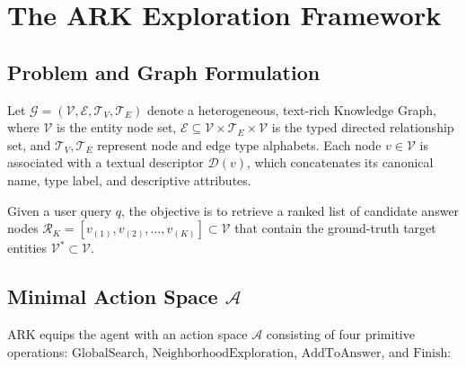 \documentclass[11pt]{article}
\begin{document}
\section{The ARK Exploration Framework}
\label{sec:framework}

\subsection{Problem and Graph Formulation}
Let $\mathcal{G} = (\mathcal{V}, \mathcal{E}, \mathcal{T}_V, \mathcal{T}_E)$ denote a heterogeneous, text-rich Knowledge Graph, where $\mathcal{V}$ is the entity node set, $\mathcal{E} \subseteq \mathcal{V} \times \mathcal{T}_E \times \mathcal{V}$ is the typed directed relationship set, and $\mathcal{T}_V, \mathcal{T}_E$ represent node and edge type alphabets. Each node $v \in \mathcal{V}$ is associated with a textual descriptor $\mathcal{D}(v)$, which concatenates its canonical name, type label, and descriptive attributes.

Given a user query $q$, the objective is to retrieve a ranked list of candidate answer nodes $\mathcal{R}_K = [v_{(1)}, v_{(2)}, \dots, v_{(K)}] \subset \mathcal{V}$ that contain the ground-truth target entities $\mathcal{V}^* \subset \mathcal{V}$.

\subsection{Minimal Action Space $\mathcal{A}$}
ARK equips the agent with an action space $\mathcal{A}$ consisting of four primitive operations: $\text{GlobalSearch}$, $\text{NeighborhoodExploration}$, $\text{AddToAnswer}$, and $\text{Finish}$:
\end{document}
